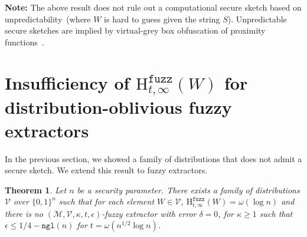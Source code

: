\documentclass[11pt]{article}
\newcommand{\class}[1]{{\ensuremath{\mathsf{#1}}}}
\newcommand{\sketch}{\ensuremath{\class{SS}}\xspace}
\newcommand{\rec}{\ensuremath{\class{Rec}}\xspace}
\newcommand{\zo}{\ensuremath{\{0, 1\}}}
\newcommand{\ngl}{\ensuremath{\mathtt{ngl}}\xspace}
\newcommand{\Hfuzz}{\mathrm{H}^{\mathtt{fuzz}}_{t,\infty}}
\newtheorem{theorem}{Theorem}[section]
\newtheorem{corollary}[theorem]{Corollary}
\begin{document}

\textbf{Note:} The above result does not rule out a computational secure sketch based on unpredictability~(where $W$ is hard to guess given the string $S$).  Unpredictable secure sketches are implied by virtual-grey box obfuscation of proximity functions~\cite{BitanskyCKP14}.  

\section{Insufficiency of $\Hfuzz(W)$ for distribution-oblivious fuzzy extractors}
\label{sec:imposs fuzz ext}
In the previous section, we showed a family of distributions that does not admit a secure sketch.  We extend this result to fuzzy extractors.  

\begin{theorem}
\label{thm:imposs fuzz ext}
Let $n$ be a security parameter.  There exists a family of distributions $\mathcal{V}$ over $\zo^n$ such that for each element $W\in \mathcal{V}$, $\Hfuzz(W)= \omega(\log n)$ and there is no $(\mathcal{M}, \mathcal{V}, \kappa, t, \epsilon)$-fuzzy extractor with error $\delta = 0$, for $\kappa \ge 1$ such that $\epsilon \le 1/4 - \ngl(n)$ for $t = \omega(n^{1/2}\log n)$. \end{theorem}
\end{document}
